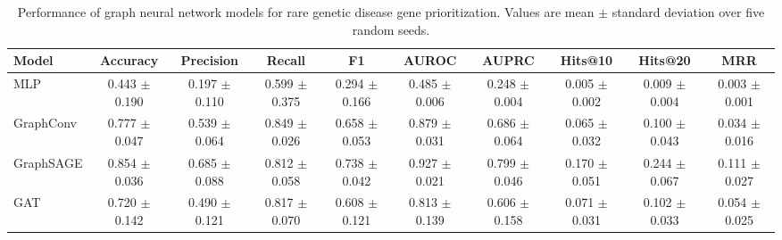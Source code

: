 \begin{table}[htbp]
\centering
\caption{Performance of graph neural network models for rare genetic disease gene prioritization. Values are mean $\pm$ standard deviation over five random seeds.}
\label{tab:benchmark_results}
\begin{tabular}{lccccccccc}
\hline
Model & Accuracy & Precision & Recall & F1 & AUROC & AUPRC & Hits@10 & Hits@20 & MRR \\
\hline
MLP & 0.443 $\pm$ 0.190 & 0.197 $\pm$ 0.110 & 0.599 $\pm$ 0.375 & 0.294 $\pm$ 0.166 & 0.485 $\pm$ 0.006 & 0.248 $\pm$ 0.004 & 0.005 $\pm$ 0.002 & 0.009 $\pm$ 0.004 & 0.003 $\pm$ 0.001 \\
GraphConv & 0.777 $\pm$ 0.047 & 0.539 $\pm$ 0.064 & 0.849 $\pm$ 0.026 & 0.658 $\pm$ 0.053 & 0.879 $\pm$ 0.031 & 0.686 $\pm$ 0.064 & 0.065 $\pm$ 0.032 & 0.100 $\pm$ 0.043 & 0.034 $\pm$ 0.016 \\
GraphSAGE & 0.854 $\pm$ 0.036 & 0.685 $\pm$ 0.088 & 0.812 $\pm$ 0.058 & 0.738 $\pm$ 0.042 & 0.927 $\pm$ 0.021 & 0.799 $\pm$ 0.046 & 0.170 $\pm$ 0.051 & 0.244 $\pm$ 0.067 & 0.111 $\pm$ 0.027 \\
GAT & 0.720 $\pm$ 0.142 & 0.490 $\pm$ 0.121 & 0.817 $\pm$ 0.070 & 0.608 $\pm$ 0.121 & 0.813 $\pm$ 0.139 & 0.606 $\pm$ 0.158 & 0.071 $\pm$ 0.031 & 0.102 $\pm$ 0.033 & 0.054 $\pm$ 0.025 \\
\hline
\end{tabular}
\end{table}